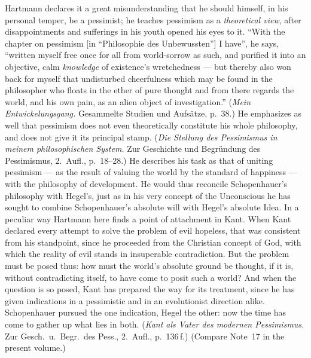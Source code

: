 \documentclass[12pt,a4paper]{book}
\newcommand{\opage}[1]{\marginnote{\footnotesize\textit{[#1]}}}
\begin{document}
Hartmann declares it a great misunderstanding that he should himself, in his
personal temper, be a pessimist; he teaches pessimism as a \emph{theoretical
view}, after disappointments and sufferings in his youth opened his eyes to it.
``With the chapter on pessimism [in ``Philosophie des Unbewussten''] I have'', he
says, ``written myself free once for all from world-sorrow as such, and purified
it into an objective, calm \emph{knowledge} of existence's wretchedness --- but
thereby also won back for myself that undisturbed cheerfulness which may be found
in the philosopher who floats in the ether of pure thought and from there regards
the world, and his own pain, as an alien object of investigation.''
(\textit{Mein Entwickelungsgang.} Gesammelte Studien und Aufsätze, p.~38.) He
emphasizes as well that pessimism does not even theoretically constitute his
whole philosophy, and does not give it its principal stamp. (\textit{Die Stellung
des Pessimismus in meinem philosophischen System.} Zur Geschichte und Begründung
des Pessimismus, 2.~Aufl., p.~18--28.) He describes his task as that of uniting
pessimism --- as the result of valuing the world by the standard of happiness ---
with the philosophy of development. He would thus reconcile Schopenhauer's
philosophy with Hegel's, just as in his very concept of the Unconscious he has
sought to combine Schopenhauer's absolute will with Hegel's absolute Idea. In a
peculiar way Hartmann here finds a point of attachment in Kant. When Kant
declared every attempt to solve the problem of evil hopeless, that was consistent
from his \opage{541}standpoint, since he proceeded from the Christian concept of God, with
which the reality of evil stands in insuperable contradiction. But the problem
must be posed thus: how must the world's absolute ground be thought, if it is,
without contradicting itself, to have come to posit such a world? And when the
question is so posed, Kant has prepared the way for its treatment, since he has
given indications in a pessimistic and in an evolutionist direction alike.
Schopenhauer pursued the one indication, Hegel the other: now the time has come
to gather up what lies in both. (\textit{Kant als Vater des modernen
Pessimismus.} Zur Gesch.\ u.\ Begr.\ des Pess., 2.~Aufl., p.~136\,f.) (Compare
Note~17 in the present volume.)
\end{document}
